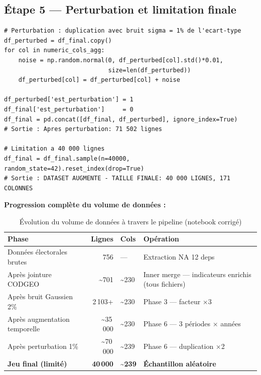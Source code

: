 \documentclass[12pt,a4paper,oneside]{report}
\begin{document}
\subsection{Étape 5 — Perturbation et limitation finale}

\begin{lstlisting}[caption={Perturbation 1\% std et limitation à 40\,000 lignes}]
# Perturbation : duplication avec bruit sigma = 1% de l'ecart-type
df_perturbed = df_final.copy()
for col in numeric_cols_agg:
    noise = np.random.normal(0, df_perturbed[col].std()*0.01,
                             size=len(df_perturbed))
    df_perturbed[col] = df_perturbed[col] + noise

df_perturbed['est_perturbation'] = 1
df_final['est_perturbation']     = 0
df_final = pd.concat([df_final, df_perturbed], ignore_index=True)
# Sortie : Apres perturbation: 71 502 lignes

# Limitation a 40 000 lignes
df_final = df_final.sample(n=40000, random_state=42).reset_index(drop=True)
# Sortie : DATASET AUGMENTE - TAILLE FINALE: 40 000 LIGNES, 171 COLONNES
\end{lstlisting}

\textbf{Progression complète du volume de données :}

\begin{table}[H]
  \centering
  \caption{Évolution du volume de données à travers le pipeline (notebook corrigé)}
  \label{tab:volume}
  \begin{tabular}{lrll}
    \toprule
    \textbf{Phase} & \textbf{Lignes} & \textbf{Cols} & \textbf{Opération} \\
    \midrule
    Données électorales brutes    & 756       & —   & Extraction NA 12 deps \\
    Après jointure CODGEO         & \textasciitilde 701  & \textasciitilde 230 & Inner merge — indicateurs enrichis (tous fichiers) \\
    Après bruit Gaussien 2\%      & 2\,103+   & \textasciitilde 230 & Phase 3 — facteur ×3 \\
    Après augmentation temporelle & \textasciitilde 35\,000 & \textasciitilde 230 & Phase 6 — 3 périodes × années \\
    Après perturbation 1\%        & \textasciitilde 70\,000 & \textasciitilde 239 & Phase 6 — duplication ×2 \\
    \textbf{Jeu final (limité)}   & \textbf{40\,000} & \textbf{\textasciitilde 239} & \textbf{Échantillon aléatoire} \\
    \bottomrule
  \end{tabular}
\end{table}
\end{document}
